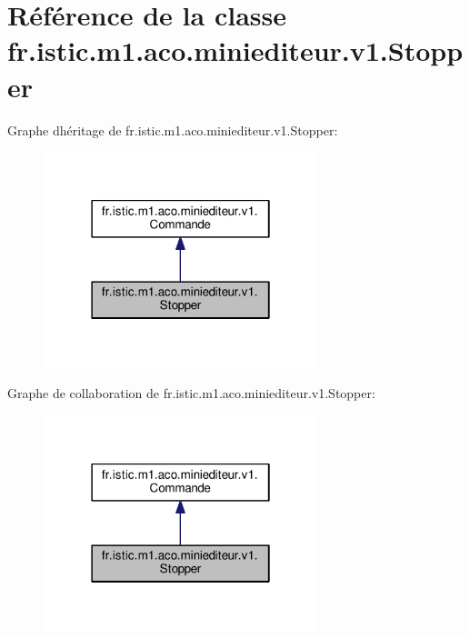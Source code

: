 \hypertarget{classfr_1_1istic_1_1m1_1_1aco_1_1miniediteur_1_1v1_1_1Stopper}{}\section{Référence de la classe fr.\+istic.\+m1.\+aco.\+miniediteur.\+v1.\+Stopper}
\label{classfr_1_1istic_1_1m1_1_1aco_1_1miniediteur_1_1v1_1_1Stopper}


Graphe d\textquotesingle{}héritage de fr.\+istic.\+m1.\+aco.\+miniediteur.\+v1.\+Stopper\+:
\nopagebreak
\begin{figure}[H]
\begin{center}
\leavevmode
\includegraphics[width=226pt]{classfr_1_1istic_1_1m1_1_1aco_1_1miniediteur_1_1v1_1_1Stopper__inherit__graph}
\end{center}
\end{figure}


Graphe de collaboration de fr.\+istic.\+m1.\+aco.\+miniediteur.\+v1.\+Stopper\+:
\nopagebreak
\begin{figure}[H]
\begin{center}
\leavevmode
\includegraphics[width=226pt]{classfr_1_1istic_1_1m1_1_1aco_1_1miniediteur_1_1v1_1_1Stopper__coll__graph}
\end{center}
\end{figure}
